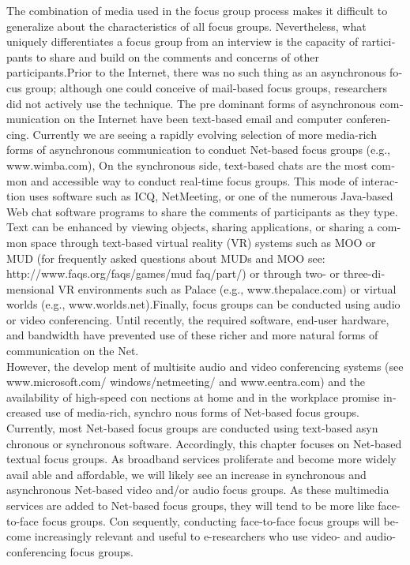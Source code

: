 \documentclass[a4 paper,12pt]{article}\usepackage{xepersian}
\begin{document}
\begin{latin}
\begin{tabular}{cccc}
\end{tabular}

\vspace{0.1cm}
\vspace{0.1cm}
\vspace{0.1cm}


The  combination of media  used in the  focus group  process  makes it difficult  to generalize  about the  characteristics of all focus  groups.  Nevertheless, what uniquely differentiates a focus  group from an interview  is the  capacity of rarticipants  to share and build  on  the  comments and  concerns of other participants.Prior to the  Internet, there was no such  thing as an asynchronous focus group; although one  could conceive of mail-based focus  groups, researchers did  not  actively  use  the  technique. The pre­ dominant forms of asynchronous communication on the  Internet have been text-based email  and computer conferencing. Currently we are seeing a rapidly evolving selection of  more media-rich forms of asynchronous communication to  conduet Net-based focus  groups  (e.g.,  www.wimba.com), On the  synchronous side,  text-based chats are the  most common and  accessible  way to conduct real-time focus groups. This mode of interaction uses software such as ICQ,  NetMeeting, or one of the numerous Java-based Web chat  software  programs to share  the  comments of participants as they type. Text can be enhanced by viewing objects, sharing  applications, or sharing  a common space through text-based virtual reality (VR) systems such as MOO or  MUD (for frequently asked  questions about  MUDs and  MOO see: http://www.faqs.org/faqs/games/mud­ faq/part/) or  through two-  or  three-dimensional VR environments such  as  Palace (e.g.,  www.thepalace.com) or  virtual   worlds  (e.g., www.worlds.net).Finally, focus groups  can  be conducted  using  audio  or  video conferencing. Until   recently, the required  software,  end-user  hardware,  and  bandwidth  have prevented  use of these richer and more natural  forms  of communication on  the  Net.\\
 However,  the  develop­ ment  of multisite  audio  and  video  conferencing systems (see  www.microsoft.com/ windows/netmeeting/ and www.eentra.com) and  the  availability of  high-speed con­ nections at home and  in the workplace promise  increased use of media-rich, synchro­ nous  forms of Net-based  focus  groups.
Currently, most  Net-based  focus groups  are conducted using  text-based  asyn­ chronous or synchronous software.  Accordingly, this  chapter focuses  on  Net-based textual  focus groups. As broadband services proliferate and become more  widely avail­ able and affordable, we will likely see  an  increase  in synchronous and  asynchronous Net-based video and/or audio  focus groups. As these multimedia services are added to Net-based focus groups, they will tend to be more like face-to-face focus groups. Con­ sequently, conducting face-to-face focus groups will  become increasingly relevant and useful to e-researchers who use video- and audio-conferencing focus groups.


\end{latin}
\end{document}
